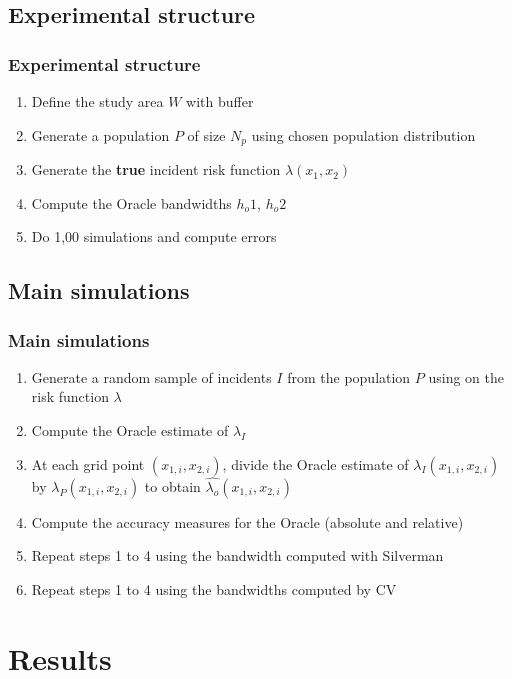 \documentclass[notheorems]{beamer}
\theoremstyle{definition}
\theoremstyle{example}
\begin{document}
\subsection{Experimental structure}
\begin{frame}\frametitle{Experimental structure}
    \begin{enumerate}
        \item Define the study area $W$ with buffer
        \item Generate a population $P$ of size $N_p$ using chosen population distribution
        \item Generate the \textbf{true} incident risk function $\lambda(x_1, x_2)$
        \item Compute the Oracle bandwidths $h_o1$, $h_o2$
        \item Do 1,00 simulations and compute errors
    \end{enumerate}
\end{frame}

\subsection{Main simulations}
\begin{frame}\frametitle{Main simulations}
    \begin{enumerate}
        \item Generate a random sample of incidents $I$ from the population $P$ using on the risk function $\lambda$
        \item Compute the Oracle estimate of $\lambda_I$
        \item At each grid point $(x_{1,i}, x_{2,i})$,
                divide the Oracle estimate of $\lambda_I(x_{1,i}, x_{2,i})$
                by $\lambda_P(x_{1,i}, x_{2,i})$ to obtain $\hat{\lambda_o}(x_{1,i}, x_{2,i})$
        \item Compute the accuracy measures for the Oracle (absolute and relative)
        \item Repeat steps 1 to 4 using the bandwidth computed with Silverman
        \item Repeat steps 1 to 4 using the bandwidths computed by CV
    \end{enumerate}
\end{frame}



\section{Results}
\end{document}
